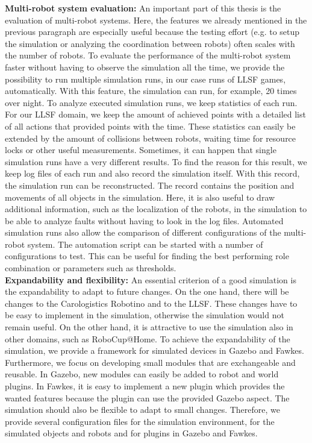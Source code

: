 \textbf{Multi-robot system evaluation:} An important part of this thesis is the evaluation of multi-robot systems. Here, the features we already mentioned in the previous paragraph are especially useful because the testing effort (e.g. to setup the simulation or analyzing the coordination between robots) often scales with the number of robots. To evaluate the performance of the multi-robot system faster without having to observe the simulation all the time, we provide the possibility to run multiple simulation runs, in our case runs of LLSF games, automatically. With this feature, the simulation can run, for example, 20 times over night. To analyze executed simulation runs, we keep statistics of each run. For our LLSF domain, we keep the amount of achieved points with a detailed list of all actions that provided points with the time. These statistics can easily be extended by the amount of collisions between robots, waiting time for resource locks or other useful measurements. Sometimes, it can happen that single simulation runs have a very different results. To find the reason for this result, we keep log files of each run and also record the simulation itself. With this record, the simulation run can be reconstructed. The record contains the position and movements of all objects in the simulation. Here, it is also useful to draw additional information, such as the localization of the robots, in the simulation to be able to analyze faults without having to look in the log files. Automated simulation runs also allow the comparison of different configurations of the multi-robot system. The automation script can be started with a number of configurations to test. This can be useful for finding the best performing role combination or parameters such as thresholds.\\
\textbf{Expandability and flexibility:} An essential criterion of a good simulation is the expandability to adapt to future changes. On the one hand, there will be changes to the Carologistics Robotino and to the LLSF. These changes have to be easy to implement in the simulation, otherwise the simulation would not remain useful. On the other hand, it is attractive to use the simulation also in other domains, such as RoboCup@Home. To achieve the expandability of the simulation, we provide a framework for simulated devices in Gazebo and Fawkes. Furthermore, we focus on developing small modules that are exchangeable and reusable. In Gazebo, new modules can easily be added to robot and world plugins. In Fawkes, it is easy to implement a new plugin which provides the wanted features because the plugin can use the provided Gazebo aspect. The simulation should also be flexible to adapt to small changes. Therefore, we provide several configuration files for the simulation environment, for the simulated objects and robots and for plugins in Gazebo and Fawkes.\\
